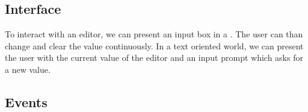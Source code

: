 \subsection{Interface}

To interact with an editor,
we can present an input box in a \GUI.
The user can than change and clear the value continuously.
In a text oriented world,
we can present the user with the current value of the editor
and an input prompt which asks for a new value.


\subsection{Events}


\endinput

Editors let us view and change a value in the system.
However, an editor can also have no value at all.
This is the case when the user clears the value.
